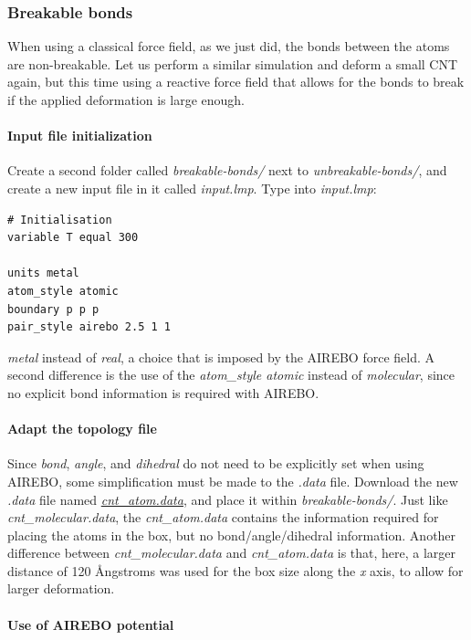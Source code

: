 \documentclass[9pt,tutorial]{livecoms}
\newcommand{\filepath}{https://raw.githubusercontent.com/lammpstutorials/lammpstutorials-article/main/files/}
\begin{document}
\subsubsection{Breakable bonds}

When using a classical force field, as we just did, the bonds between the atoms
are non-breakable. Let us perform a similar simulation and deform a small
CNT again, but this time using a reactive force field that allows for the bonds
to break if the applied deformation is large enough.

\paragraph{Input file initialization}
Create a second folder called \textit{breakable-bonds/} next to
\textit{unbreakable-bonds/}, and create a new input file in it called
\textit{input.lmp}. Type into \textit{input.lmp}:
\begin{lstlisting}
# Initialisation
variable T equal 300

units metal
atom_style atomic
boundary p p p
pair_style airebo 2.5 1 1
\end{lstlisting}
\textit{metal} instead of \textit{real}, a choice that is imposed by the
AIREBO force field. A second difference is the use of the
\textit{atom\_style atomic} instead of \textit{molecular}, since no explicit
bond information is required with AIREBO.

\paragraph{Adapt the topology file}

Since \textit{bond}, \textit{angle}, and \textit{dihedral} do not need to be
explicitly set when using AIREBO, some simplification must be made to the
\textit{.data} file. Download the new \textit{.data}
file named \href{\filepath tutorial2/breakable-bonds/cnt_atom.data}{\textit{cnt\_atom.data}},
and place it within \textit{breakable-bonds/}. Just like \textit{cnt\_molecular.data},
the \textit{cnt\_atom.data} contains the information
required for placing the atoms in the box, but no bond/angle/dihedral information.
Another difference between \textit{cnt\_molecular.data} and \textit{cnt\_atom.data}
is that, here, a larger distance of 120 Ångstroms was used for the box size along
the \textit{x} axis, to allow for larger deformation.

\paragraph{Use of AIREBO potential}
\end{document}
